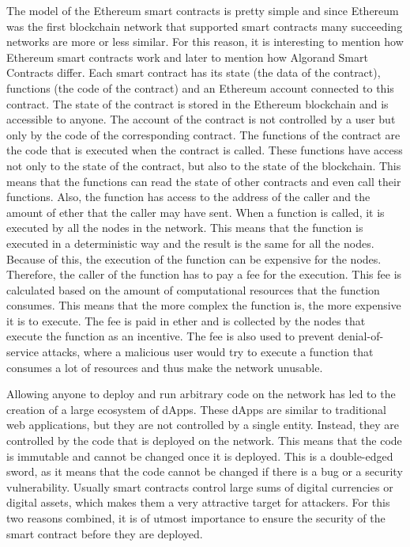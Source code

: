 The model of the Ethereum smart contracts is pretty simple and since Ethereum was the first blockchain network that supported smart contracts many succeeding networks are more or less similar. For this reason, it is interesting to mention how Ethereum smart contracts work and later to mention how Algorand Smart Contracts differ. Each smart contract has its state (the data of the contract), functions (the code of the contract) and an Ethereum account connected to this contract. The state of the contract is stored in the Ethereum blockchain and is accessible to anyone. The account of the contract is not controlled by a user but only by the code of the corresponding contract. The functions of the contract are the code that is executed when the contract is called. These functions have access not only to the state of the contract, but also to the state of the blockchain. This means that the functions can read the state of other contracts and even call their functions. Also, the function has access to the address of the caller and the amount of ether that the caller may have sent. When a function is called, it is executed by all the nodes in the network. This means that the function is executed in a deterministic way and the result is the same for all the nodes. Because of this, the execution of the function can be expensive for the nodes. Therefore, the caller of the function has to pay a fee for the execution. This fee is calculated based on the amount of computational resources that the function consumes. This means that the more complex the function is, the more expensive it is to execute. The fee is paid in ether and is collected by the nodes that execute the function as an incentive. The fee is also used to prevent denial-of-service attacks, where a malicious user would try to execute a function that consumes a lot of resources and thus make the network unusable.

Allowing anyone to deploy and run arbitrary code on the network has led to the creation of a large ecosystem of \acp{dApp}. These \acp{dApp} are similar to traditional web applications, but they are not controlled by a single entity. Instead, they are controlled by the code that is deployed on the network. This means that the code is immutable and cannot be changed once it is deployed. This is a double-edged sword, as it means that the code cannot be changed if there is a bug or a security vulnerability. Usually smart contracts control large sums of digital currencies or digital assets, which makes them a very attractive target for attackers. For this two reasons combined, it is of utmost importance to ensure the security of the smart contract before they are deployed.


